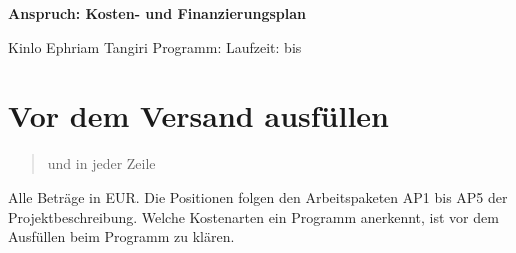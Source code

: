 \documentclass[11pt,a4paper,parskip=half-]{scrartcl}
\begin{document}
{\LARGE\sffamily\bfseries Anspruch: Kosten- und Finanzierungsplan\par}
Kinlo Ephriam Tangiri \textperiodcentered{}
Programm:  \textperiodcentered{}
Laufzeit:  bis \par

\section*{Vor dem Versand ausfüllen}
\begin{quote}\raggedright
{} \textperiodcentered{}
 \textperiodcentered{}  \textperiodcentered{}
 und  in jeder Zeile \textperiodcentered{}
 \textperiodcentered{}  \textperiodcentered{}
 \textperiodcentered{}
 \textperiodcentered{}  \textperiodcentered{}
 \textperiodcentered{} 
\end{quote}
Alle Beträge in EUR. Die Positionen folgen den Arbeitspaketen AP1 bis AP5 der Projektbeschreibung.
Welche Kostenarten ein Programm anerkennt, ist vor dem Ausfüllen beim Programm zu klären.
\end{document}
